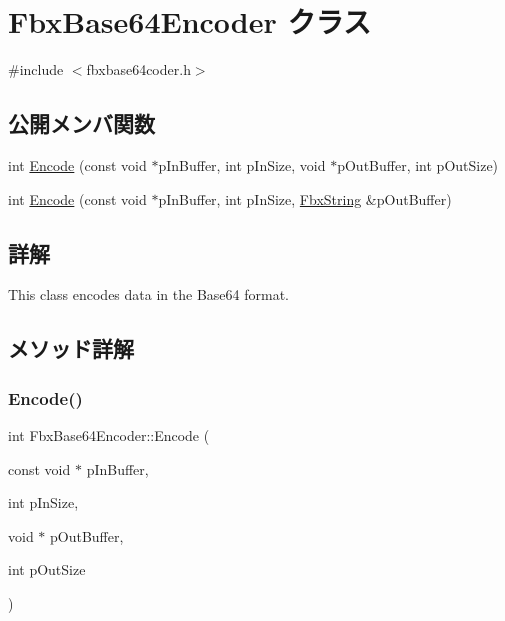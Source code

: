 \hypertarget{class_fbx_base64_encoder}{}\section{Fbx\+Base64\+Encoder クラス}
\label{class_fbx_base64_encoder}


{\ttfamily \#include $<$fbxbase64coder.\+h$>$}

\subsection*{公開メンバ関数}
\begin{DoxyCompactItemize}
\item 
int \hyperlink{class_fbx_base64_encoder_a53124f67f78035c7c024da2ee7ba2063}{Encode} (const void $\ast$p\+In\+Buffer, int p\+In\+Size, void $\ast$p\+Out\+Buffer, int p\+Out\+Size)
\item 
int \hyperlink{class_fbx_base64_encoder_afe16a82c30d642c73f78df4d648765c8}{Encode} (const void $\ast$p\+In\+Buffer, int p\+In\+Size, \hyperlink{class_fbx_string}{Fbx\+String} \&p\+Out\+Buffer)
\end{DoxyCompactItemize}


\subsection{詳解}
This class encodes data in the Base64 format. 

\subsection{メソッド詳解}
\mbox{\label{class_fbx_base64_encoder_a53124f67f78035c7c024da2ee7ba2063}} 
\subsubsection{\texorpdfstring{Encode()}{Encode()}\hspace{0.1cm}{\footnotesize\ttfamily [1/2]}}
{\footnotesize\ttfamily int Fbx\+Base64\+Encoder\+::\+Encode (\begin{DoxyParamCaption}\item[{const void $\ast$}]{p\+In\+Buffer,  }\item[{int}]{p\+In\+Size,  }\item[{void $\ast$}]{p\+Out\+Buffer,  }\item[{int}]{p\+Out\+Size }\end{DoxyParamCaption})}

